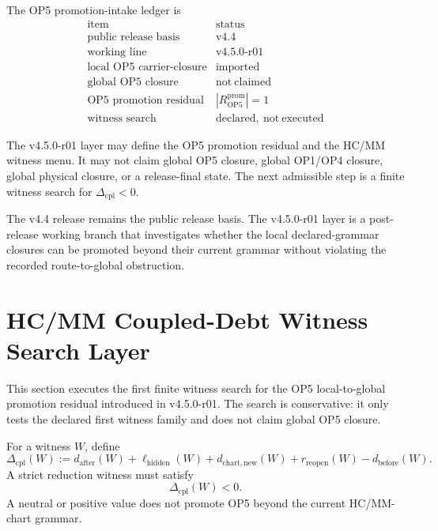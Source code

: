 \begin{proposition}
The OP5 promotion-intake ledger is
\[
\begin{array}{c|c}
\text{item} & \text{status}\\
\hline
\text{public release basis} & \mathrm{v4.4}\\
\text{working line} & \mathrm{v4.5.0\mbox{-}r01}\\
\text{local OP5 carrier-closure} & \mathrm{imported}\\
\text{global OP5 closure} & \mathrm{not\ claimed}\\
\text{OP5 promotion residual} & |R_{\mathrm{OP5}}^{\mathrm{prom}}|=1\\
\text{witness search} & \mathrm{declared,\ not\ executed}
\end{array}
\]
\end{proposition}

\begin{theorem}
The v4.5.0-r01 layer may define the OP5 promotion residual and the HC/MM
witness menu.  It may not claim global OP5 closure, global OP1/OP4 closure,
global physical closure, or a release-final state.  The next admissible step is
a finite witness search for \( \Delta_{\mathrm{cpl}}<0 \).
\end{theorem}

\begin{remark}[Relation to v4.4]
The v4.4 release remains the public release basis.  The v4.5.0-r01 layer is a
post-release working branch that investigates whether the local declared-grammar
closures can be promoted beyond their current grammar without violating the
recorded route-to-global obstruction.
\end{remark}



\section{HC/MM Coupled-Debt Witness Search Layer}
\label{sec:v450-r02-hcmm-coupled-debt-witness-search}

This section executes the first finite witness search for the OP5
local-to-global promotion residual introduced in v4.5.0-r01. The search is
conservative: it only tests the declared first witness family and does not
claim global OP5 closure.

\begin{definition}
For a witness \(W\), define
\[
    \Delta_{\mathrm{cpl}}(W)
    :=
    d_{\mathrm{after}}(W)
    + \ell_{\mathrm{hidden}}(W)
    + d_{\mathrm{chart,new}}(W)
    + r_{\mathrm{reopen}}(W)
    - d_{\mathrm{before}}(W).
\]
A strict reduction witness must satisfy
\[
    \Delta_{\mathrm{cpl}}(W)<0.
\]
A neutral or positive value does not promote OP5 beyond the current
HC/MM-chart grammar.
\end{definition}


